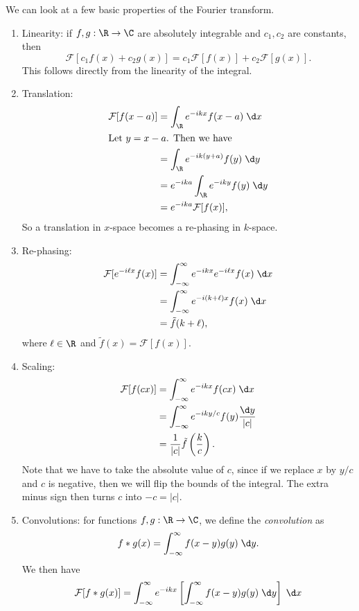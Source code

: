 \documentclass[a4paper]{article}
\begin{document}
We can look at a few basic properties of the Fourier transform.
\begin{enumerate}
  \item Linearity: if $f, g: \R \to \C$ are absolutely integrable and $c_1, c_2$ are constants, then
    \[
      \mathcal{F}[c_1 f(x) + c_2 g(x)] = c_1 \mathcal{F}[f(x)] + c_2 \mathcal{F}[g(x)].
    \]
    This follows directly from the linearity of the integral.
  \item Translation:
    \begin{align*}
      \mathcal{F}[f(x - a)] &= \int_{\R}e^{-ikx} f(x - a)\;\d x \\
      \intertext{Let $y = x - a$. Then we have}
      &= \int_{\R} e^{-ik(y + a)}f (y) \;\d y \\
      &= e^{-ika} \int_{\R} e^{-iky}f(y)\;\d y \\
      &= e^{-ika}\mathcal{F}[f(x)],
    \end{align*}
    So a translation in $x$-space becomes a re-phasing in $k$-space.
  \item Re-phasing:
    \begin{align*}
      \mathcal{F}[e^{-i\ell x}f(x)] &= \int_{-\infty}^\infty e^{-ikx} e^{-i\ell x} f(x)\;\d x\\
      &= \int_{-\infty}^\infty e^{-i(k + \ell)x} f(x)\;\d x\\
      &= \tilde{f}(k + \ell),
    \end{align*}
    where $\ell \in \R$ and $\tilde{f}(x) = \mathcal{F}[f(x)]$.
  \item Scaling:
    \begin{align*}
      \mathcal{F}[f(cx)] &= \int_{-\infty}^\infty e^{-ikx}f(cx)\;\d x\\
      &= \int_{-\infty}^\infty e^{-iky/c} f(y) \frac{\d y}{|c|}\\
      &= \frac{1}{|c|} \tilde{f}\left(\frac{k}{c}\right).
    \end{align*}
    Note that we have to take the absolute value of $c$, since if we replace $x$ by $y/c$ and $c$ is negative, then we will flip the bounds of the integral. The extra minus sign then turns $c$ into $-c = |c|$.
  \item Convolutions: for functions $f, g: \R \to \C$, we define the \emph{convolution} as
    \[
      f * g (x) = \int_{-\infty}^\infty f(x - y) g(y)\;\d y.
    \]
    We then have
    \begin{align*}
      \mathcal{F}[f * g(x)] &= \int_{-\infty}^\infty e^{-ikx} \left[\int_{-\infty}^{\infty} f(x - y)g(y) \;\d y\right] \;\d x\\

\end{align*}
\end{enumerate}
\end{document}
